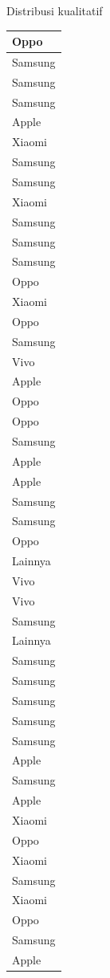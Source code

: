 \documentclass[
  ignorenonframetext,
]{beamer}
\begin{document}
\begin{frame}[s]{Distribusi kualitatif}
\begin{table}
\begin{tabular}[t]{l}
\hline
Oppo\\
\hline
Samsung\\
\hline
Samsung\\
\hline
Samsung\\
\hline
Apple\\
\hline
Xiaomi\\
\hline
Samsung\\
\hline
Samsung\\
\hline
Xiaomi\\
\hline
Samsung\\
\hline
Samsung\\
\hline
Samsung\\
\hline
Oppo\\
\hline
Xiaomi\\
\hline
Oppo\\
\hline
Samsung\\
\hline
Vivo\\
\hline
Apple\\
\hline
Oppo\\
\hline
Oppo\\
\hline
Samsung\\
\hline
Apple\\
\hline
Apple\\
\hline
Samsung\\
\hline
Samsung\\
\hline
Oppo\\
\hline
Lainnya\\
\hline
Vivo\\
\hline
Vivo\\
\hline
Samsung\\
\hline
Lainnya\\
\hline
Samsung\\
\hline
Samsung\\
\hline
Samsung\\
\hline
Samsung\\
\hline
Samsung\\
\hline
Apple\\
\hline
Samsung\\
\hline
Apple\\
\hline
Xiaomi\\
\hline
Oppo\\
\hline
Xiaomi\\
\hline
Samsung\\
\hline
Xiaomi\\
\hline
Oppo\\
\hline
Samsung\\
\hline
Apple\\

\end{tabular}
\end{table}
\end{frame}
\end{document}
